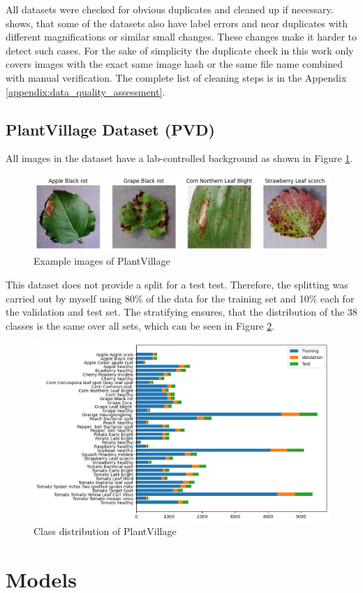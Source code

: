 All datasets were checked for obvious duplicates and cleaned up if necessary. \autocite{groeger2023} shows, that some of the datasets also have label errors and near duplicates with different magnifications or similar small changes. These changes make it harder to detect such cases. For the sake of simplicity the duplicate check in this work only covers images with the exact same image hash or the same file name combined with manual verification. The complete list of cleaning steps is in the Appendix \ref{appendix:data_quality_assessment}.

\subsection{PlantVillage Dataset (PVD)}
All images in the dataset have a lab-controlled background as shown in Figure \ref{fig:example_images_of_plantvillage}.

\begin{figure}[H]
    \begin{center}
    \includegraphics[width=15cm]{../images/example_images_of_plantvillage.png}
    \caption{Example images of PlantVillage}
    \label{fig:example_images_of_plantvillage}
    \end{center}
\end{figure}

This dataset does not provide a split for a test test. Therefore, the splitting was carried out by myself using 80\% of the data for the training set and 10\% each for the validation and test set. The stratifying ensures, that the distribution of the 38 classes is the same over all sets, which can be seen in Figure \ref{fig:class_distribution_of_plantvillage}. 

\begin{figure}[H]
    \begin{center}
    \includegraphics[width=15cm]{../images/class_distribution_of_plantvillage.png}
    \caption{Class distribution of PlantVillage}
    \label{fig:class_distribution_of_plantvillage}
    \end{center}
\end{figure}

\section{Models}
